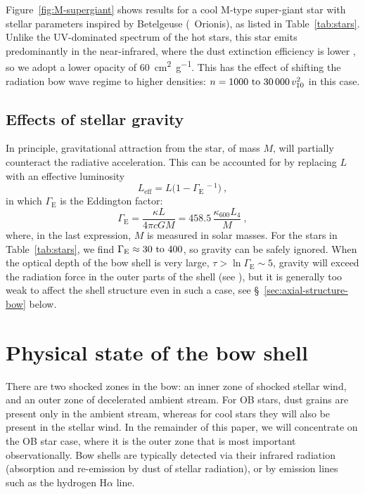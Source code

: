Figure~\ref{fig:M-supergiant} shows results for a cool M-type
super-giant star with stellar parameters inspired by Betelgeuse
(\chemalpha~Orionis), as listed in Table~\ref{tab:stars}.  Unlike the
UV-dominated spectrum of the hot stars, this star emits predominantly
in the near-infrared, where the dust extinction efficiency is lower \citep{Weingartner:2001a},
so we adopt a lower opacity of \SI{60}{cm^2.g^{-1}}.  This has the
effect of shifting the radiation bow wave regime to higher densities:
\(n = \text{\numrange{1000}{30 000}}\, v_{10}^2\) in this case.


\subsection{Effects of stellar gravity}
\label{sec:effects-gravity}

In principle, gravitational attraction from the star, of mass \(M\),
will partially counteract the radiative acceleration.  This can be
accounted for by replacing \(L\) with an effective luminosity
\newcommand\Edd{\ensuremath{_{\text{E}}}}
\begin{equation}
  \label{eq:effective-luminosity}
  L_{\text{eff}} = L \bigl(1 - \Gamma\Edd^{\,-1}\bigr) \ ,
\end{equation}
in which \(\Gamma\Edd\) is the Eddington factor:
\begin{equation}
  \label{eq:eddington-factor}
  \Gamma\Edd = \frac{\kappa L}{4\pi c G M} = 458.5 \, \frac{\kappa_{600} L_4}{ M } \ ,
\end{equation}
where, in the last expression, \(M\) is measured in solar masses.  For
the stars in Table~\ref{tab:stars}, we find
\(\Gamma\Edd \approx \text{\numrange{30}{400}}\), so gravity can be safely
ignored.  When the optical depth of the bow shell is very large,
\(\tau > \ln\Gamma\Edd \sim 5\), gravity will exceed the radiation force in the
outer parts of the shell (see \citealt{Rodriguez-Ramirez:2016b}), but
it is generally too weak to affect the shell structure even in such a
case, see \S~\ref{sec:axial-structure-bow} below.


\section{Physical state of the bow shell}
\label{sec:phys-state-shock}

There are two shocked zones in the bow: an inner zone of shocked
stellar wind, and an outer zone of decelerated ambient stream. For OB
stars, dust grains are present only in the ambient stream, whereas for
cool stars they will also be present in the stellar wind.  In the
remainder of this paper, we will concentrate on the OB star case,
where it is the outer zone that is most important observationally.
Bow shells are typically detected via their infrared radiation (absorption
and re-emission by dust of stellar radiation), or by emission lines
such as the hydrogen H\(\alpha\) line.

